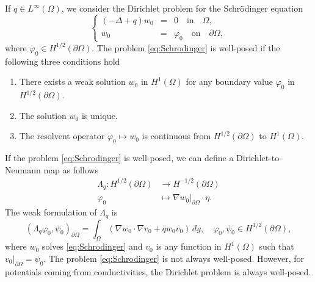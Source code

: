 \documentclass[12pt]{article}
\begin{document}
If $q\in L^{\infty}(\Omega)$, we consider the Dirichlet problem for the Schr\"{o}dinger equation
\begin{equation}\label{eq:Schrodinger}
\left\{
	\begin{array}{rclll}
(-\Delta +q)w_0&=& 0 \quad \mbox{in}\quad \Omega,\\
w_0&=&\varphi_0\quad \mbox{on}\quad \partial\Omega,
\end{array}
\right. 
\end{equation}
where $\varphi_0\in H^{1/2}(\partial\Omega)$.
The problem \eqref{eq:Schrodinger} is well-posed if the following three conditions hold
\begin{enumerate}
    \item There exists a weak solution $w_0$ in $H^1(\Omega)$ for any boundary value $\varphi_0$ in $H^{1/2}(\partial\Omega)$.
    \item The solution $w_0$ is unique.
    \item The resolvent operator $\varphi_0\mapsto w_0$ is continuous from $H^{1/2}(\partial\Omega)$ to $H^1(\Omega)$.
\end{enumerate}
If the problem \eqref{eq:Schrodinger} is well-posed, we can define a Dirichlet-to-Neumann map as follows
\begin{align}\label{eq:D-N-Schrodinger}
\nonumber    \Lambda_{q}\colon H^{1/2}(\partial\Omega) &\to H^{-1/2}(\partial\Omega)\\
    \varphi_0 &\mapsto \nabla w_0|_{\partial\Omega}\cdot \eta.
\end{align}
The weak formulation of $\Lambda_q$ is
\begin{equation}\label{weak-D-N-Schrodinger}
(\Lambda_q \varphi_0,\psi_0)_{\partial\Omega}=\int_{\Omega} (\nabla w_0\cdot \nabla v_0+qw_0v_0)\, dy, \quad \varphi_0, \psi_0\in H^{1/2}(\partial\Omega),
\end{equation}
where $w_0$ solves \eqref{eq:Schrodinger} and $v_0$ is any function in $H^1(\Omega)$ such that $v_0|_{\partial\Omega}=\psi_0$. The problem \eqref{eq:Schrodinger} is not always well-posed. However, for potentials coming from conductivities, the Dirichlet problem is always well-posed.
\end{document}
